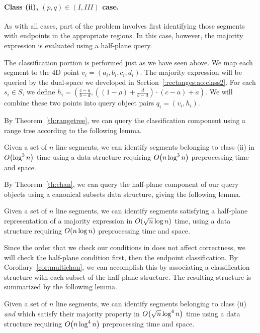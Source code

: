 \paragraph{Class (ii), $(p, q) \in (I, III)$ case.} 
As with all cases, part of the problem involves first identifying those segments with endpoints in the appropriate regions.
In this case, however, the majority expression is evaluated using a half-plane query.

The classification portion is performed just as we have seen above. We map each segment to the 4D point $v_i = ( a_i, b_i, c_i, d_i )$. The majority expression will be queried by the dual-space we developed in Section~\ref{:rectanges:ao:class2}. For each $s_i \in S$, we define $h_i = \left ( \frac{c - a}{b - d}, \left ( (1 - \rho) + \frac{d}{b-d} \right ) \cdot (c-a) + a \right )$.  We will combine these two points into query object pairs $q_i = (v_i, h_i)$.

By Theorem~\ref{th:rangetree}, we can query the classification component using a range tree according to the following lemma.
\begin{lemma}
\label{lem:ao:class2:v}
Given a set of $n$ line segments, we can identify segments belonging to class (ii) in $O\!\left(\log^3{n}\right)$ time using a data structure requiring $O\!\left(n\log^3{n}\right)$ preprocessing time and space.
\end{lemma}

By Theorem~\ref{th:chan}, we can query the half-plane component of our query objects using a canonical subsets data structure, giving the following lemma.

\begin{lemma}
\label{lem:ao:class2:h}
Given a set of $n$ line segments, we can identify segments satisfying a half-plane representation of a majority expression in $O\!\left(\sqrt{n}\log{n}\right)$ time, using a data structure requiring $O\!\left(n\log{n}\right)$ preprocessing time and space.
\end{lemma}

Since the order that we check our conditions in does not affect correctness, we will check the half-plane condition first, then the endpoint classification.  
By Corollary~\ref{cor:multichan}, we can accomplish this by associating a classification structure with each subset of the half-plane structure. The resulting structure is summarized by the following lemma.

\begin{lemma}
\label{lem:ao:class2:c}
Given a set of $n$ line segments, we can identify segments belonging to class (ii) \emph{and} which satisfy their majority property in $O\!\left(\sqrt{n}\log^4{n}\right)$ time using a data structure requiring $O\!\left(n\log^4{n}\right)$ preprocessing time and space.
\end{lemma}


